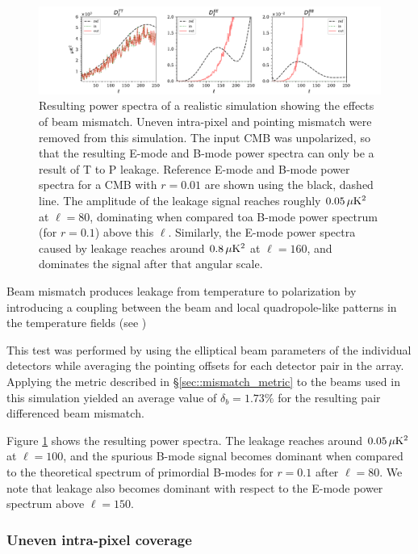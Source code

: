 \documentclass[a4paper,11pt]{article}
\begin{document}
\begin{figure}

	\centering
	\includegraphics[width=1.0\textwidth, trim = {2.4cm 0.0cm 2.3cm 0.0cm}, clip ]{figures/beamMismatch_2.pdf}
	\caption{Resulting power spectra of a realistic simulation showing the effects of beam mismatch. Uneven intra-pixel and pointing mismatch were removed from this simulation. The input CMB was unpolarized, so that the resulting E-mode and B-mode power spectra can only be a result of T to P leakage. Reference E-mode and B-mode power spectra for a CMB with $r=0.01$ are shown using the black, dashed line. The amplitude of the leakage signal reaches roughly $0.05\, \mu\rm{K}^2$ at $\ell=80$, dominating when compared toa B-mode power spectrum (for $r=0.1$) above this $\ell$. Similarly, the E-mode power spectra caused by leakage reaches around $0.8 \, \mu\rm{K}^2$ at $\ell=160$, and dominates the signal after that angular scale.}
	\label{fig::pisco4class_beammismatch}
\end{figure}


Beam mismatch produces leakage from temperature to polarization by introducing a coupling between the beam and local quadropole-like patterns in the temperature fields (see \cite{2007MNRAS.376.1767O}) 

This test was performed by using the elliptical beam parameters of the individual detectors while averaging the pointing offsets for each detector pair in the array. Applying the metric described in \S\ref{sec::mismatch_metric} to the beams used in this simulation yielded an average value of  $\delta_b = 1.73\%$ for the resulting pair differenced beam mismatch. 

Figure \ref{fig::pisco4class_beammismatch} shows the resulting power spectra. The leakage reaches around $0.05\, \mu\rm{K}^2$ at $\ell=100$, and the spurious B-mode signal becomes dominant when compared to the theoretical spectrum of primordial B-modes for $r=0.1$ after $\ell=80$. We note that leakage also becomes dominant with respect to the E-mode power spectrum above $\ell=150$. 

\subsubsection{Uneven intra-pixel coverage}
\end{document}
